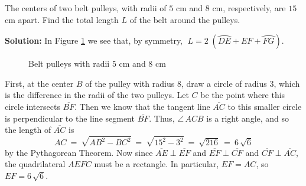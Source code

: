 \divider
\newpage
\begin{exmp}\label{exmp:pulleys}
 The centers of two belt pulleys, with radii of $5$ cm and $8$ cm, respectively, are $15$ cm apart.
 Find the total length $L$ of the belt around the pulleys.\vspace{1mm}
 \par\noindent\textbf{Solution:} In Figure \ref{fig:pulley} we see that, by symmetry,
 $\;L = 2\;(\wideparen{DE} + EF + \wideparen{FG})$.

\begin{figure}[h]
 \begin{center}
  \vspace{-6mm}
 \end{center}
 \caption[]{\quad Belt pulleys with radii $5$ cm and $8$ cm}
 \label{fig:pulley}
\end{figure}

 First, at the center $B$ of the pulley with radius $8$, draw a circle of radius $3$, which is the
 difference in the radii of the two pulleys. Let $C$ be the point where this circle intersects
 $\overline{BF}$. Then we know that the tangent line $\overline{AC}$ to
 this smaller circle is perpendicular to the line segment  $\overline{BF}$. Thus,
 $\angle\,ACB$ is a right angle, and so the length of $\overline{AC}$ is
 \begin{displaymath}
  AC ~=~ \sqrt{AB^2 - BC^2} ~=~ \sqrt{15^2 - 3^2} ~=~ \sqrt{216} ~=~ 6\,\sqrt{6}
 \end{displaymath}
 by the Pythagorean Theorem. Now since $\overline{AE} \perp \overline{EF}$ and
 $\overline{EF} \perp \overline{CF}$ and $\overline{CF} \perp \overline{AC}$, the quadrilateral
 $AEFC$ must be a rectangle. In particular, $EF = AC$, so $EF = 6\,\sqrt{6}$.
 

\end{exmp}
